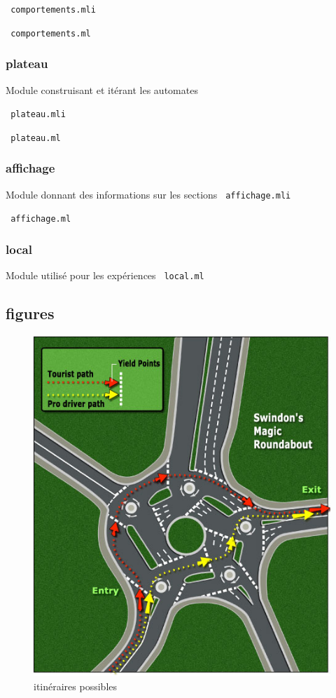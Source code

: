 \documentclass[11pt]{article}
\begin{document}
\verb+ comportements.mli+


\verb+ comportements.ml+

			\subsubsection{plateau}
Module construisant et itérant les automates

\verb+ plateau.mli+


\verb+ plateau.ml+

			\subsubsection{affichage}
Module donnant des informations sur les sections
\verb+ affichage.mli+


\verb+ affichage.ml+

			\subsubsection{local}
Module utilisé pour les expériences
\verb+ local.ml+



\subsection{figures}
\label{figs}
\begin{figure}[p]
		\begin{center}
			\includegraphics[scale=0.4]{images/itin}
			\caption{\label{itin} itinéraires possibles}
		\end{center}
	\end{figure}
\end{document}
